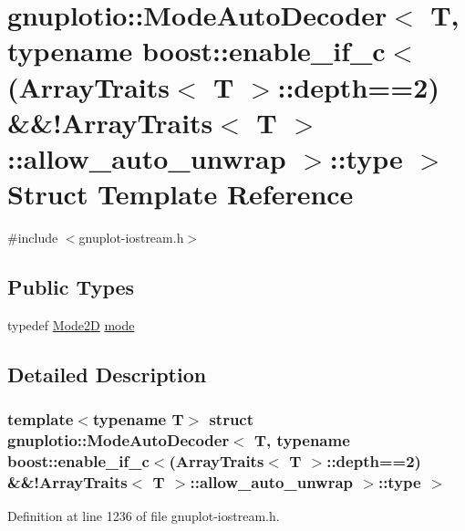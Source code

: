 \hypertarget{structgnuplotio_1_1_mode_auto_decoder_3_01_t_00_01typename_01boost_1_1enable__if__c_3_07_array_t40de9ad20cf29b501e884c0f76d7ac36}{}\section{gnuplotio\+:\+:Mode\+Auto\+Decoder$<$ T, typename boost\+:\+:enable\+\_\+if\+\_\+c$<$(Array\+Traits$<$ T $>$\+:\+:depth==2) \&\&!\+Array\+Traits$<$ T $>$\+:\+:allow\+\_\+auto\+\_\+unwrap $>$\+:\+:type $>$ Struct Template Reference}
\label{structgnuplotio_1_1_mode_auto_decoder_3_01_t_00_01typename_01boost_1_1enable__if__c_3_07_array_t40de9ad20cf29b501e884c0f76d7ac36}


{\ttfamily \#include $<$gnuplot-\/iostream.\+h$>$}

\subsection*{Public Types}
\begin{DoxyCompactItemize}
\item 
typedef \hyperlink{structgnuplotio_1_1_mode2_d}{Mode2D} \hyperlink{structgnuplotio_1_1_mode_auto_decoder_3_01_t_00_01typename_01boost_1_1enable__if__c_3_07_array_t40de9ad20cf29b501e884c0f76d7ac36_a4a741dbcbd1404fdfef24420a7867d26}{mode}
\end{DoxyCompactItemize}


\subsection{Detailed Description}
\subsubsection*{template$<$typename T$>$\newline
struct gnuplotio\+::\+Mode\+Auto\+Decoder$<$ T, typename boost\+::enable\+\_\+if\+\_\+c$<$(\+Array\+Traits$<$ T $>$\+::depth==2) \&\&!\+Array\+Traits$<$ T $>$\+::allow\+\_\+auto\+\_\+unwrap $>$\+::type $>$}



Definition at line 1236 of file gnuplot-\/iostream.\+h.



